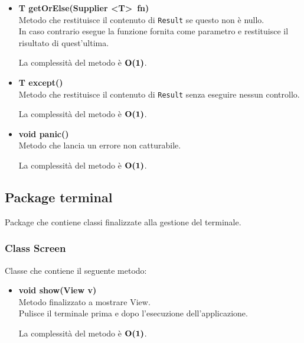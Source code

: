 \documentclass[a4paper, 12pt]{scrreprt}
\begin{document}
\begin{itemize}
					\item \textbf{T getOrElse(Supplier \textless T\textgreater~fn)}
					\\Metodo che restituisce il contenuto di \verb!Result! se questo non \`e nullo.
					\\In caso contrario esegue la funzione fornita come parametro e restituisce il risultato di quest'ultima.
					
					La complessit\`a del metodo \`e $\mathbf{O}\textbf{(1)}$.
	
					\item \textbf{T except()}
					\\Metodo che restituisce il contenuto di \verb!Result! senza eseguire nessun controllo.
					
					La complessit\`a del metodo \`e $\mathbf{O}\textbf{(1)}$.
	
					\item \textbf{void panic()}
					\\Metodo che lancia un errore non catturabile.
					
					La complessit\`a del metodo \`e $\mathbf{O}\textbf{(1)}$.
					
				\end{itemize}

			\subsection{Package terminal}
			Package che contiene classi finalizzate alla gestione del terminale.
				\subsubsection{Class Screen}
				Classe che contiene il seguente metodo:
				\begin{itemize}
					\item \textbf{void show(View v)}
					\\Metodo finalizzato a mostrare View.
					\\Pulisce il terminale prima e dopo l'esecuzione dell'applicazione.
					
					La complessit\`a del metodo \`e $\mathbf{O}\textbf{(1)}$.
					
				\end{itemize}
\end{document}
